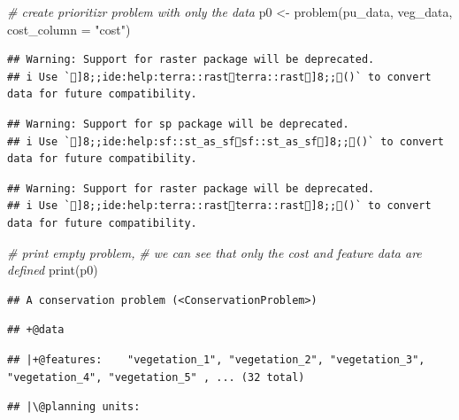 \documentclass[
  12pt,
]{book}
\newenvironment{Shaded}{\begin{snugshade}}{\end{snugshade}}
\newcommand{\AttributeTok}[1]{\textcolor[rgb]{0.77,0.63,0.00}{#1}}
\newcommand{\CommentTok}[1]{\textcolor[rgb]{0.56,0.35,0.01}{\textit{#1}}}
\newcommand{\FunctionTok}[1]{\textcolor[rgb]{0.00,0.00,0.00}{#1}}
\newcommand{\NormalTok}[1]{#1}
\newcommand{\OtherTok}[1]{\textcolor[rgb]{0.56,0.35,0.01}{#1}}
\newcommand{\StringTok}[1]{\textcolor[rgb]{0.31,0.60,0.02}{#1}}
\begin{document}
\begin{Shaded}
\begin{Highlighting}[]
\CommentTok{\# create prioritizr problem with only the data}
\NormalTok{p0 }\OtherTok{\textless{}{-}} \FunctionTok{problem}\NormalTok{(pu\_data, veg\_data, }\AttributeTok{cost\_column =} \StringTok{"cost"}\NormalTok{)}
\end{Highlighting}
\end{Shaded}

\begin{verbatim}
## Warning: Support for raster package will be deprecated.
## i Use `]8;;ide:help:terra::rastterra::rast]8;;()` to convert data for future compatibility.
\end{verbatim}

\begin{verbatim}
## Warning: Support for sp package will be deprecated.
## i Use `]8;;ide:help:sf::st_as_sfsf::st_as_sf]8;;()` to convert data for future compatibility.
\end{verbatim}

\begin{verbatim}
## Warning: Support for raster package will be deprecated.
## i Use `]8;;ide:help:terra::rastterra::rast]8;;()` to convert data for future compatibility.
\end{verbatim}

\begin{Shaded}
\begin{Highlighting}[]
\CommentTok{\# print empty problem,}
\CommentTok{\# we can see that only the cost and feature data are defined}
\FunctionTok{print}\NormalTok{(p0)}
\end{Highlighting}
\end{Shaded}

\begin{verbatim}
## A conservation problem (<ConservationProblem>)
\end{verbatim}

\begin{verbatim}
## +@data
\end{verbatim}

\begin{verbatim}
## |+@features:    "vegetation_1", "vegetation_2", "vegetation_3", "vegetation_4", "vegetation_5" , ... (32 total)
\end{verbatim}

\begin{verbatim}
## |\@planning units:
\end{verbatim}
\end{document}
